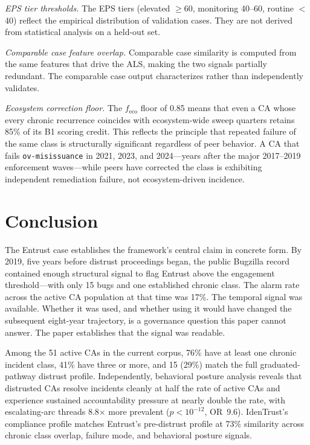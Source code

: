 \documentclass[10pt,twocolumn,letterpaper]{article}
\begin{document}
\textit{EPS tier thresholds.} The EPS tiers (elevated $\geq$60, monitoring 40--60, routine
$<$40) reflect the empirical distribution of validation cases. They are not derived from
statistical analysis on a held-out set.

\textit{Comparable case feature overlap.} Comparable case similarity is computed from the
same features that drive the ALS, making the two signals partially redundant. The
comparable case output characterizes rather than independently validates.

\textit{Ecosystem correction floor.} The $f_\text{eco}$ floor of 0.85 means that
even a CA whose every chronic recurrence coincides with ecosystem-wide sweep quarters
retains 85\% of its B1 scoring credit. This reflects the principle that repeated
failure of the same class is structurally significant regardless of peer behavior.
A CA that fails \texttt{ov-misissuance} in 2021, 2023, and 2024---years after the
major 2017--2019 enforcement waves---while peers have corrected the class is
exhibiting independent remediation failure, not ecosystem-driven incidence.

\section{Conclusion}
\label{sec:conclusion}

The Entrust case establishes the framework's central claim in concrete form. By 2019,
five years before distrust proceedings began, the public Bugzilla record contained
enough structural signal to flag Entrust above the engagement threshold---with only 15
bugs and one established chronic class. The alarm rate across the active CA population
at that time was 17\%. The temporal signal was available. Whether it was used, and whether
using it would have changed the subsequent eight-year trajectory, is a governance question
this paper cannot answer. The paper establishes that the signal was readable.

Among the 51 active CAs in the current corpus, 76\% have at least one chronic incident
class, 41\% have three or more, and 15 (29\%) match the full graduated-pathway distrust
profile. Independently, behavioral posture analysis reveals that distrusted CAs resolve
incidents cleanly at half the rate of active CAs and experience sustained accountability
pressure at nearly double the rate, with escalating-arc threads 8.8$\times$ more
prevalent ($p < 10^{-12}$, OR~9.6). IdenTrust's compliance profile matches Entrust's
pre-distrust profile at 73\% similarity across chronic class overlap, failure mode, and
behavioral posture signals.
\end{document}

